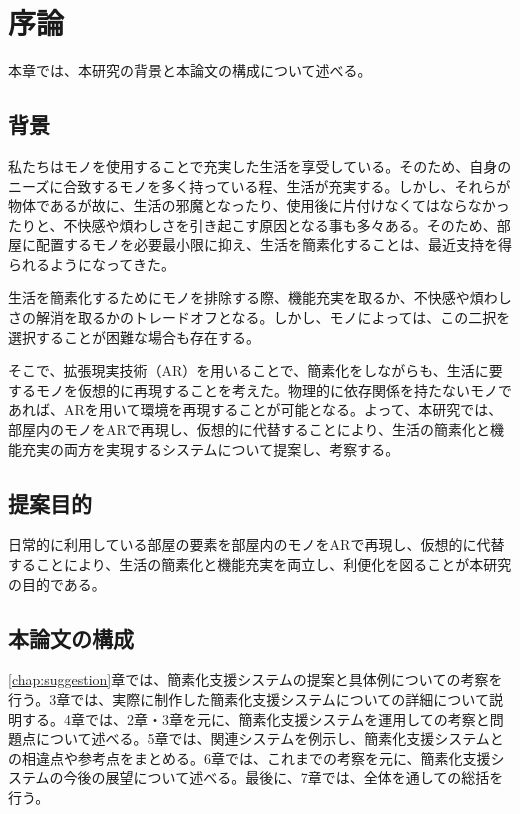 \chapter{序論}
\label{chap:introduction}

本章では、本研究の背景と本論文の構成について述べる。

\newpage

\section{背景}

私たちはモノを使用することで充実した生活を享受している。そのため、自身のニーズに合致するモノを多く持っている程、生活が充実する。しかし、それらが物体であるが故に、生活の邪魔となったり、使用後に片付けなくてはならなかったりと、不快感や煩わしさを引き起こす原因となる事も多々ある。そのため、部屋に配置するモノを必要最小限に抑え、生活を簡素化することは、最近支持を得られるようになってきた。

生活を簡素化するためにモノを排除する際、機能充実を取るか、不快感や煩わしさの解消を取るかのトレードオフとなる。しかし、モノによっては、この二択を選択することが困難な場合も存在する。

そこで、拡張現実技術（AR）を用いることで、簡素化をしながらも、生活に要するモノを仮想的に再現することを考えた。物理的に依存関係を持たないモノであれば、ARを用いて環境を再現することが可能となる。よって、本研究では、部屋内のモノをARで再現し、仮想的に代替することにより、生活の簡素化と機能充実の両方を実現するシステムについて提案し、考察する。

\section{提案目的}

日常的に利用している部屋の要素を部屋内のモノをARで再現し、仮想的に代替することにより、生活の簡素化と機能充実を両立し、利便化を図ることが本研究の目的である。

\section{本論文の構成}

\ref{chap:suggestion}章では、簡素化支援システムの提案と具体例についての考察を行う。3章では、実際に制作した簡素化支援システムについての詳細について説明する。4章では、2章・3章を元に、簡素化支援システムを運用しての考察と問題点について述べる。5章では、関連システムを例示し、簡素化支援システムとの相違点や参考点をまとめる。6章では、これまでの考察を元に、簡素化支援システムの今後の展望について述べる。最後に、7章では、全体を通しての総括を行う。
